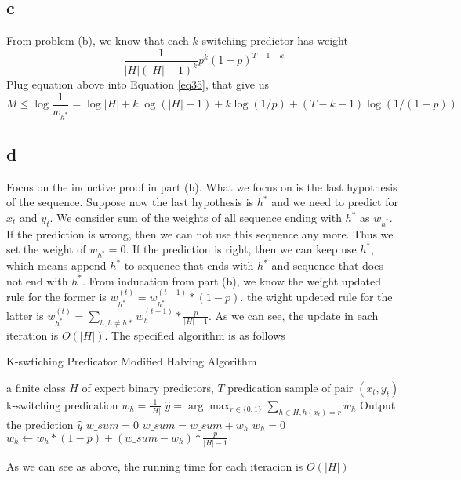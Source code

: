 \documentclass{article}
\begin{document}
	\subsection{c}
	From problem (b), we know that each $k$-switching predictor has weight
	\begin{equation}
	\frac{1}{|H|(|H|-1)^{k}}p^{k}(1-p)^{T-1-k}
	\label{eq41}
	\end{equation}
	Plug equation above into Equation \ref{eq35}, that give us
	\begin{equation}
	M \leq \log\frac{1}{w_{h^*}} = \log|H|+k\log(|H|-1)+k\log(1/p)+(T-k-1)\log(1/(1-p))
	\label{eq42}
	\end{equation}

	\subsection{d}
	Focus on the inductive proof in part (b). What we focus on is the last hypothesis of the sequence. Suppose now the last hypothesis is $h^*$ and we need to predict for $x_t$ and $y_t$. We consider sum of the weights of all sequence ending with $h^*$ as $w_{h^*}$. If the prediction is wrong, then we can not use this sequence any more. Thus we set the weight of $w_{h^*}=0$. If the prediction is right, then we can keep use $h^*$, which means append $h^*$ to sequence that ends with $h^*$ and sequence that does not end with $h^*$. From inducation from part (b), we know the weight updated rule for the former is $w^{(t)}_{h^*}=w^{(t-1)}_{h^*}*(1-p)$. the wight updeted rule for the latter is $w^{(t)}_{h^*}=\sum_{h,h \neq h*}w_h^{(t-1)}*\frac{p}{|H|-1}$. As we can see, the update in each iteration is $O(|H|)$. The specified algorithm is as follows

	\begin{algorithm}
	\caption{K-swtiching Predicator Modified Halving Algorithm}
	\label{alg:A}
	\begin{algorithmic}[1]
		\Require a finite class $H$ of expert binary predictors, $T$ predication sample of pair $(x_t,y_t)$
		\Ensure k-switching predication
		\State $w_h=\frac{1}{|H|}$
		\EndFor
			\State $\hat{y}=\arg\max_{r \in \{0,1\}}\sum_{h \in H, h(x_t)=r}w_h$
			\State Output the prediction $\hat{y}$
				\State $w\_sum=0$
					\State $w\_sum=w\_sum+w_h$
				\EndFor
				\State $w_h=0$
			\Else
				\State $w_h \leftarrow w_h * (1-p) + (w\_sum-w_h)* \frac{p}{|H|-1}$
			\EndIf
			\EndFor
		\EndFor
	\end{algorithmic}
	\end{algorithm}
	As we can see as above, the running time for each iteracion is $O(|H|)$
\end{document}

